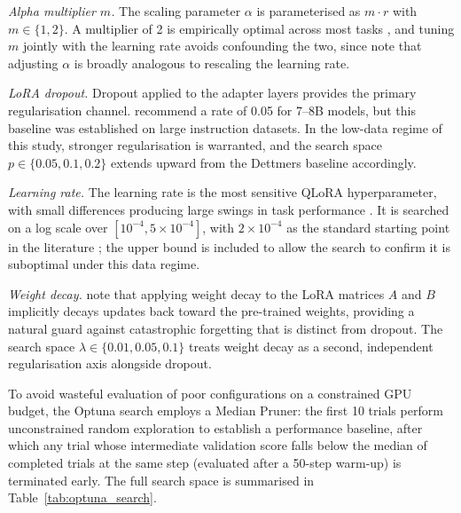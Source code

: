 \textit{Alpha multiplier $m$.}
The scaling parameter $\alpha$ is parameterised as $m \cdot r$ with
$m \in \{1, 2\}$. A multiplier of 2 is empirically optimal across most tasks
\citep{raschka2023lora}, and tuning $m$ jointly with the learning rate avoids
confounding the two, since \citet{hu2021lora} note that adjusting $\alpha$ is
broadly analogous to rescaling the learning rate.

\textit{LoRA dropout.}
Dropout applied to the adapter layers provides the primary regularisation
channel. \citet{dettmers2023qlora} recommend a rate of 0.05 for 7--8B models,
but this baseline was established on large instruction datasets.
In the low-data regime of this study, stronger regularisation is warranted, and
the search space $p \in \{0.05, 0.1, 0.2\}$ extends upward from the Dettmers
baseline accordingly.

\textit{Learning rate.}
The learning rate is the most sensitive QLoRA hyperparameter, with small
differences producing large swings in task performance \citep{biderman2024lora}.
It is searched on a log scale over $[10^{-4}, 5 \times 10^{-4}]$, with
$2 \times 10^{-4}$ as the standard starting point in the literature
\citep{dettmers2023qlora, finlora2024}; the upper bound is included to allow the
search to confirm it is suboptimal under this data regime.

\textit{Weight decay.}
\citet{hu2021lora} note that applying weight decay to the LoRA matrices $A$ and
$B$ implicitly decays updates back toward the pre-trained weights, providing a
natural guard against catastrophic forgetting that is distinct from dropout.
The search space $\lambda \in \{0.01, 0.05, 0.1\}$ treats weight decay as a
second, independent regularisation axis alongside dropout.

To avoid wasteful evaluation of poor configurations on a constrained GPU budget,
the Optuna search employs a Median Pruner: the first 10 trials perform unconstrained
random exploration to establish a performance baseline, after which any trial
whose intermediate validation score falls below the median of completed trials at
the same step (evaluated after a 50-step warm-up) is terminated early.
The full search space is summarised in Table~\ref{tab:optuna_search}.

